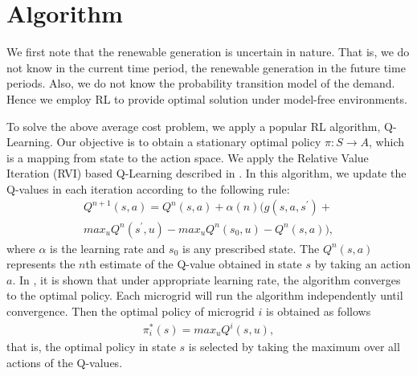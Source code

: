 \section{Algorithm}\label{sec:algo}
We first note that the renewable generation is uncertain in nature. That is, we do not know in the current time period, the renewable generation in the future time periods. Also, we do not know the probability transition model of the demand. Hence we employ  RL to provide optimal solution under model-free environments.

To solve the above average cost problem, we apply a popular RL algorithm, Q-Learning. Our objective is to obtain a stationary optimal policy $\pi : S \rightarrow A$, which is a mapping from state to the action space.  
We apply the Relative Value Iteration (RVI) based Q-Learning described in \cite{avgcost}. In this algorithm, we update the Q-values in each iteration according to the following rule:
\begin{align}
Q^{n+1}(s,a) = Q^{n}(s,a) + \alpha(n)(g(s,a,s^{'}) + \\ max_{u} Q^{n}(s^{'},u) - max_{u} Q^{n}(s_{0},u) - Q^{n}(s,a)),
\end{align}
where $\alpha$ is the learning rate and $s_{0}$ is any prescribed state.
The $Q^n(s,a)$ represents the $n$th estimate of the Q-value  obtained in state $s$ by taking an action $a$. In \cite{avgcost}, it is shown that under appropriate learning rate, the algorithm converges to the  optimal policy. 
Each microgrid will run the algorithm independently until convergence. Then the optimal policy of microgrid $i$ is obtained as follows
\begin{align}
\pi_{i}^{*}(s) = max_{u}Q^{i}(s,u),
\end{align}
that is, the optimal policy in state $s$ is selected by taking the maximum over all actions of the Q-values.  

